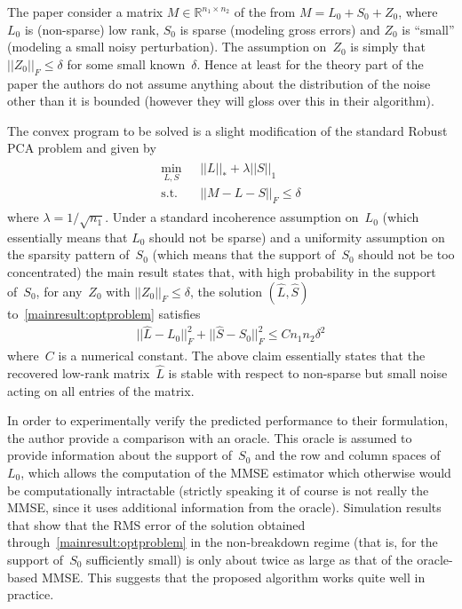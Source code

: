 \documentclass{../common/projectreport}
\begin{document}
The paper consider a matrix $M\in\mathbb{R}^{n_1\times n_2}$ of the from $M = L_0+S_0+Z_0$, where~$L_0$ is (non-sparse) low rank, $S_0$ is sparse (modeling gross errors) and $Z_0$ is ``small'' (modeling a small noisy perturbation). The assumption on~$Z_0$ is simply that $||Z_0||_F \leq \delta$ for some small known~$\delta$. Hence at least for the theory part of the paper the authors do not assume anything about the distribution of the noise other than it is bounded (however they will gloss over this in their algorithm). 

The convex program to be solved is a slight modification of the standard Robust PCA problem and given by
\begin{align}
\begin{split}
\min_{L,S} \; &||L||_* + \lambda ||S||_1 \\
\text{s.t.} \quad &||M-L-S||_F \leq \delta
\end{split}
\label{mainresult:optproblem}
\end{align}
where $\lambda = 1/\sqrt{n_1}$. Under a standard incoherence assumption on~$L_0$ (which essentially means that $L_0$ should not be sparse) and a uniformity assumption on the sparsity pattern of~$S_0$ (which means that the support of~$S_0$ should not be too concentrated) the main result states that, with high probability in the support of~$S_0$, for any~$Z_0$ with $||Z_0||_F \leq \delta$, the solution $(\hat{L},\hat{S})$ to~\eqref{mainresult:optproblem} satisfies
\begin{align*}
||\hat{L}-L_0||_F^2 + ||\hat{S}-S_0||_F^2 \leq C n_1n_2\delta^2
\end{align*}
where~$C$ is a numerical constant. The above claim essentially states that the recovered low-rank matrix~$\hat{L}$ is stable with respect to non-sparse but small noise acting on all entries of the matrix.

In order to experimentally verify the predicted performance to their formulation, the author provide a comparison with an oracle. This oracle is assumed to provide information about the support of~$S_0$ and the row and column spaces of~$L_0$, which allows the computation of the MMSE estimator which otherwise would be computationally intractable (strictly speaking it of course is not really the MMSE, since it uses additional information from the oracle). Simulation results that show that the RMS error of the solution obtained through~\eqref{mainresult:optproblem} in the non-breakdown regime (that is, for the support of~$S_0$ sufficiently small) is only about twice as large as that of the oracle-based MMSE. This suggests that the proposed algorithm works quite well in practice. 
\end{document}
